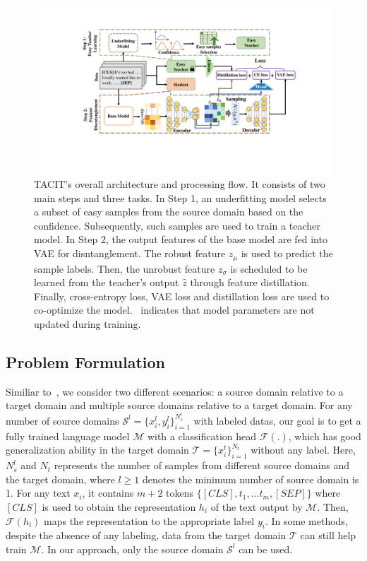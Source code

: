 \documentclass[letterpaper]{article} %
\begin{document}
\begin{figure}[t]
	\centering
	\includegraphics[width=1.5\columnwidth]{model.pdf}
	\caption{TACIT's overall architecture and processing flow. It consists of two main steps and three tasks. In Step 1, an underfitting model selects a subset of easy samples from the source domain based on the confidence. Subsequently, such samples are used to train a teacher model. In Step 2, the output features of the base model are fed into VAE for disntanglement. The robust feature $z_\mu$ is used to predict the sample labels. Then, the unrobust feature $z_\sigma$ is scheduled to be learned from the teacher's output $\hat{z}$ through feature distillation. Finally, cross-entropy loss, VAE loss and distillation loss are used to co-optimize the model. \faLock ~indicates that model parameters are not updated during training.}
	\label{fig:model}
\end{figure}

\subsection{Problem Formulation}
Similiar to~\cite{WuS22}, we consider two different scenarios: a source domain relative to a target domain and multiple source domains relative to a target domain. For any number of source domains $\mathcal{S}^l=\{x_i^l, y_i^l\}_{i=1}^{N^l_s}$ with labeled datas, our goal is to get a fully trained language model $\mathcal{M}$ with a classification head $\mathcal{F}(.)$, which has good generalization ability in the target domain $\mathcal{T}=\{x_i^t\}_{i=1}^{N_t}$ without any label. Here, $N^l_s$ and $N_t$ represents the number of samples from different source domains and the target domain, where $l\geq 1$ denotes the minimum number of source domain is 1. For any text $x_i$, it contains $m+2$ tokens $\{[CLS], t_1, ... t_m, [SEP]\}$ where $[CLS]$ is used to obtain the representation $h_i$ of the text output by $\mathcal{M}$. Then, $\mathcal{F}(h_i)$ maps the representation to the appropriate label $y_i$. In some methods, despite the absence of any labeling, data from the target domain $\mathcal{T}$ can still help train $\mathcal{M}$. In our approach, only the source domain $\mathcal{S}^l$ can be used.
\end{document}
